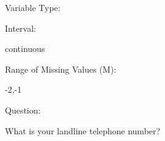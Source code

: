 \documentclass[
]{article}
\begin{document}
\begin{minipage}[t]{0.3\linewidth}

Variable Type:

\end{minipage}%
\begin{minipage}[t]{0.7\linewidth}

\end{minipage}

\begin{minipage}[t]{0.3\linewidth}

Interval:

\end{minipage}%
\begin{minipage}[t]{0.7\linewidth}

continuous

\end{minipage}

\begin{minipage}[t]{0.3\linewidth}

Range of Missing Values (M):

\end{minipage}%
\begin{minipage}[t]{0.7\linewidth}

-2,-1

\end{minipage}

\begin{minipage}[t]{0.3\linewidth}

Question:

\end{minipage}%
\begin{minipage}[t]{0.7\linewidth}

What is your landline telephone number?

\end{minipage}
\end{document}
